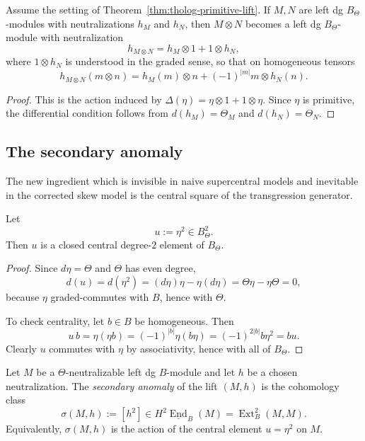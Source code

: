 \begin{corollary}
Assume the setting of Theorem~\ref{thm:tholog-primitive-lift}.
If \(M,N\) are left dg \(B_{\Theta}\)-modules with neutralizations \(h_{M}\) and \(h_{N}\), then \(M\otimes N\) becomes a left dg \(B_{\Theta}\)-module with neutralization
\[
h_{M\otimes N}=h_{M}\otimes 1+1\otimes h_{N},
\]
where \(1\otimes h_{N}\) is understood in the graded sense, so that on homogeneous tensors
\[
h_{M\otimes N}(m\otimes n)=h_{M}(m)\otimes n+(-1)^{|m|}m\otimes h_{N}(n).
\]
\end{corollary}

\begin{proof}
This is the action induced by \(\Delta(\eta)=\eta\otimes 1+1\otimes \eta\).
Since \(\eta\) is primitive, the differential condition follows from \(d(h_{M})=\Theta_{M}\) and \(d(h_{N})=\Theta_{N}\).
\end{proof}

\subsection{The secondary anomaly}

The new ingredient which is invisible in naive supercentral models and inevitable in the corrected skew model is the central square of the transgression generator.

\begin{proposition}
Let
\[
u:=\eta^{2}\in B_{\Theta}^{2}.
\]
Then \(u\) is a closed central degree-\(2\) element of \(B_{\Theta}\).
\end{proposition}

\begin{proof}
Since \(d\eta=\Theta\) and \(\Theta\) has even degree,
\[
d(u)=d(\eta^{2})=(d\eta)\eta-\eta(d\eta)=\Theta\eta-\eta\Theta=0,
\]
because \(\eta\) graded-commutes with \(B\), hence with \(\Theta\).

To check centrality, let \(b\in B\) be homogeneous.
Then
\[
u\,b=\eta(\eta b)=(-1)^{|b|}\eta(b\eta)=(-1)^{2|b|}b\eta^{2}=bu.
\]
Clearly \(u\) commutes with \(\eta\) by associativity, hence with all of \(B_{\Theta}\).
\end{proof}

\begin{definition}
Let \(M\) be a \(\Theta\)-neutralizable left dg \(B\)-module and let \(h\) be a chosen neutralization.
The \emph{secondary anomaly} of the lift \((M,h)\) is the cohomology class
\[
\sigma(M,h):=[h^{2}]
\in
H^{2}\underline{\operatorname{End}}_{B}(M)
=
\operatorname{Ext}^{2}_{B}(M,M).
\]
Equivalently, \(\sigma(M,h)\) is the action of the central element \(u=\eta^{2}\) on \(M\).
\end{definition}


